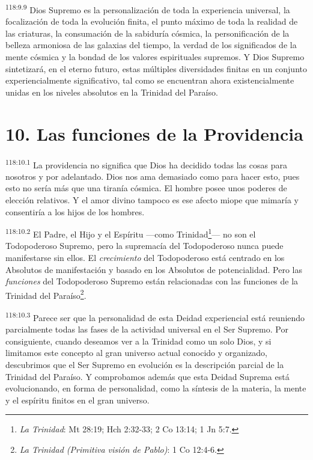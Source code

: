 \par
\textsuperscript{118:9.9} Dios Supremo es la personalización de toda la experiencia universal, la focalización de toda la evolución finita, el punto máximo de toda la realidad de las criaturas, la consumación de la sabiduría cósmica, la personificación de la belleza armoniosa de las galaxias del tiempo, la verdad de los significados de la mente cósmica y la bondad de los valores espirituales supremos. Y Dios Supremo sintetizará, en el eterno futuro, estas múltiples diversidades finitas en un conjunto experiencialmente significativo, tal como se encuentran ahora existencialmente unidas en los niveles absolutos en la Trinidad del Paraíso.

\section*{10. Las funciones de la Providencia}
\par
\textsuperscript{118:10.1} La providencia no significa que Dios ha decidido todas las cosas para nosotros y por adelantado. Dios nos ama demasiado como para hacer esto, pues esto no sería más que una tiranía cósmica. El hombre posee unos poderes de elección relativos. Y el amor divino tampoco es ese afecto miope que mimaría y consentiría a los hijos de los hombres.

\par
\textsuperscript{118:10.2} El Padre, el Hijo y el Espíritu ---como Trinidad\footnote{\textit{La Trinidad}: Mt 28:19; Hch 2:32-33; 2 Co 13:14; 1 Jn 5:7.}--- no son el Todopoderoso Supremo, pero la supremacía del Todopoderoso nunca puede manifestarse sin ellos. El \textit{crecimiento} del Todopoderoso está centrado en los Absolutos de manifestación y basado en los Absolutos de potencialidad. Pero las \textit{funciones} del Todopoderoso Supremo están relacionadas con las funciones de la Trinidad del Paraíso\footnote{\textit{La Trinidad (Primitiva visión de Pablo)}: 1 Co 12:4-6.}.

\par
\textsuperscript{118:10.3} Parece ser que la personalidad de esta Deidad experiencial está reuniendo parcialmente todas las fases de la actividad universal en el Ser Supremo. Por consiguiente, cuando deseamos ver a la Trinidad como un solo Dios, y si limitamos este concepto al gran universo actual conocido y organizado, descubrimos que el Ser Supremo en evolución es la descripción parcial de la Trinidad del Paraíso. Y comprobamos además que esta Deidad Suprema está evolucionando, en forma de personalidad, como la síntesis de la materia, la mente y el espíritu finitos en el gran universo.

